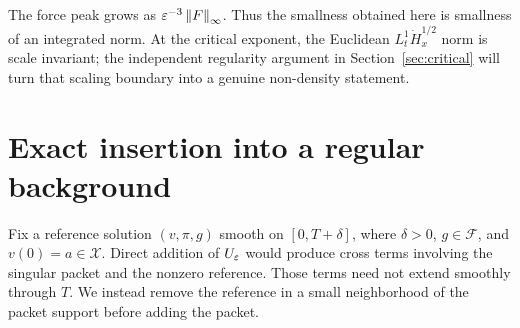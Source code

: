 \documentclass[11pt,a4paper]{article}
\theoremstyle{definition}\newtheorem{definition}[theorem]{Definition}
\theoremstyle{remark}\newtheorem{remark}[theorem]{Remark}
\newcommand{\FF}{\mathcal F}\newcommand{\XX}{\mathcal X}
\newcommand{\norm}[1]{\left\lVert#1\right\rVert}
\begin{document}
The force peak grows as $\eps^{-3}\norm{F}_\infty$. Thus the smallness obtained here is smallness of an integrated norm. At the critical exponent, the Euclidean $L^1_t\dot H^{1/2}_x$ norm is scale invariant; the independent regularity argument in Section~\ref{sec:critical} will turn that scaling boundary into a genuine non-density statement.

\section{Exact insertion into a regular background}\label{sec:insertion}
Fix a reference solution $(v,\pi,g)$ smooth on $[0,T+\delta]$, where
$\delta>0$, $g\in\FF$, and $v(0)=a\in\XX$. Direct addition of $U_\varepsilon$ would produce cross terms involving the singular packet and the nonzero reference. Those terms need not extend smoothly through $T$. We instead remove the reference in a small neighborhood of the packet support before adding the packet.
\end{document}
